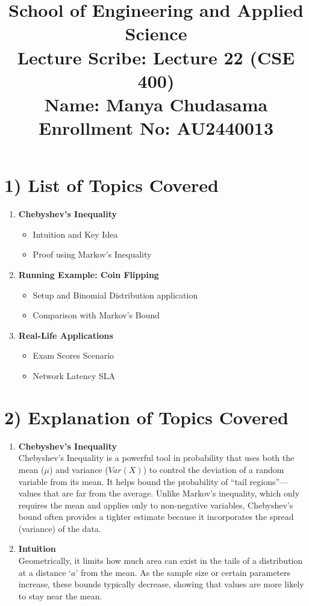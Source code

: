 \documentclass[11pt]{article}
\title{
    \Large \textbf{School of Engineering and Applied Science} \\
    \vspace{0.5cm}
    \large \textbf{Lecture Scribe}: Lecture 22 (CSE 400) \\
    \vspace{0.2cm}
    \normalsize \textbf{Name:} Manya Chudasama\\
    \vspace{0.2cm}
    \normalsize \textbf{Enrollment No:} AU2440013
}
\date{}
\begin{document}
\maketitle
\section*{1) List of Topics Covered}
\begin{enumerate}
    \item \textbf{Chebyshev’s Inequality}
    \begin{itemize}
        \item Intuition and Key Idea
        \item Proof using Markov’s Inequality
    \end{itemize}
    \item \textbf{Running Example: Coin Flipping}
    \begin{itemize}
        \item Setup and Binomial Distribution application
        \item Comparison with Markov’s Bound
    \end{itemize}
    \item \textbf{Real-Life Applications}
    \begin{itemize}
        \item Exam Scores Scenario
        \item Network Latency SLA
    \end{itemize}
\end{enumerate}

\section*{2) Explanation of Topics Covered}
\begin{enumerate}
    \item \textbf{Chebyshev’s Inequality} \\
    Chebyshev’s Inequality is a powerful tool in probability that uses both the mean ($\mu$) and variance ($Var(X)$) to control the deviation of a random variable from its mean. It helps bound the probability of ``tail regions''—values that are far from the average. Unlike Markov's inequality, which only requires the mean and applies only to non-negative variables, Chebyshev's bound often provides a tighter estimate because it incorporates the spread (variance) of the data.

    \item \textbf{Intuition} \\
    Geometrically, it limits how much area can exist in the tails of a distribution at a distance `$a$' from the mean. As the sample size or certain parameters increase, these bounds typically decrease, showing that values are more likely to stay near the mean. 
\end{enumerate}
\end{document}
